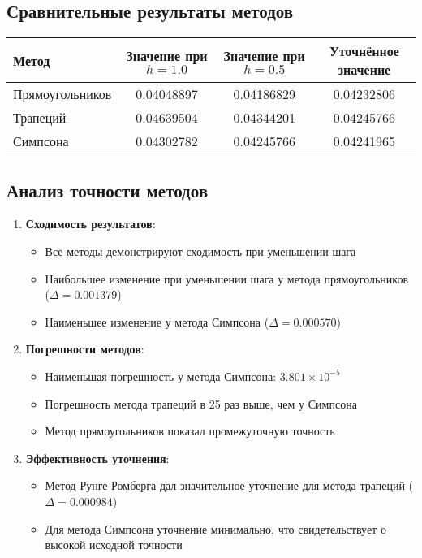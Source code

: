 \subsection*{Сравнительные результаты методов}
\begin{table}[h]
\centering
\begin{tabular}{lccc}
\toprule
Метод & Значение при $h=1.0$ & Значение при $h=0.5$ & Уточнённое значение \\
\midrule
Прямоугольников & 0.04048897 & 0.04186829 & 0.04232806 \\
Трапеций & 0.04639504 & 0.04344201 & 0.04245766 \\
Симпсона & 0.04302782 & 0.04245766 & 0.04241965 \\
\bottomrule
\end{tabular}
\end{table}

\subsection*{Анализ точности методов}
\begin{enumerate}
\item \textbf{Сходимость результатов}:
\begin{itemize}
\item Все методы демонстрируют сходимость при уменьшении шага
\item Наибольшее изменение при уменьшении шага у метода прямоугольников ($\Delta = 0.001379$)
\item Наименьшее изменение у метода Симпсона ($\Delta = 0.000570$)
\end{itemize}

\item \textbf{Погрешности методов}:
\begin{itemize}
\item Наименьшая погрешность у метода Симпсона: $3.801 \times 10^{-5}$
\item Погрешность метода трапеций в 25 раз выше, чем у Симпсона
\item Метод прямоугольников показал промежуточную точность
\end{itemize}

\item \textbf{Эффективность уточнения}:
\begin{itemize}
\item Метод Рунге-Ромберга дал значительное уточнение для метода трапеций ($\Delta = 0.000984$)
\item Для метода Симпсона уточнение минимально, что свидетельствует о высокой исходной точности
\end{itemize}
\end{enumerate}

\pagebreak
